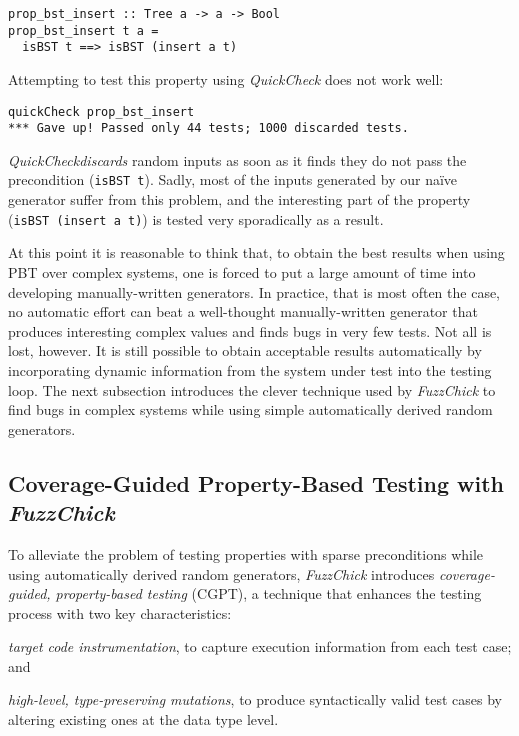 \documentclass[sigconf, anonymous]{acmart}
\newcommand{\quickcheck}{\textit{QuickCheck}\xspace}
\newcommand{\fuzzchick}{\textit{FuzzChick}\xspace}
\begin{document}
\begin{verbatim}
prop_bst_insert :: Tree a -> a -> Bool
prop_bst_insert t a =
  isBST t ==> isBST (insert a t)
\end{verbatim}

\noindent Attempting to test this property using \quickcheck does not work well:

\begin{verbatim}
quickCheck prop_bst_insert
*** Gave up! Passed only 44 tests; 1000 discarded tests.
\end{verbatim}

\noindent \quickcheck \emph{discards} random inputs as soon as it finds they do
not pass the precondition (\texttt{isBST t}).
%
Sadly, most of the inputs generated by our na\"ive generator suffer from this
problem, and the interesting part of the property (\texttt{isBST (insert a t)})
is tested very sporadically as a result.


At this point it is reasonable to think that, to obtain the best results when
using PBT over complex systems, one is forced to put a large amount of time into
developing manually-written generators.
%
In practice, that is most often the case, no automatic effort can beat a
well-thought manually-written generator that produces interesting complex values
and finds bugs in very few tests.
%
Not all is lost, however.
%
It is still possible to obtain acceptable results automatically by incorporating
dynamic information from the system under test into the testing loop.
%
The next subsection introduces the clever technique used by \fuzzchick to find
bugs in complex systems while using simple automatically derived random
generators.


\subsection{Coverage-Guided Property-Based Testing with \fuzzchick}

To alleviate the problem of testing properties with sparse preconditions while
using automatically derived random generators, \fuzzchick introduces
\emph{coverage-guided, property-based testing} (CGPT), a technique that enhances
the testing process with two key characteristics:
%
\begin{inparaenum}
\item \emph{target code instrumentation}, to capture execution information from
  each test case; and
\item \emph{high-level, type-preserving mutations}, to produce syntactically
  valid test cases by altering existing ones at the data type level.
\end{inparaenum}
\end{document}
